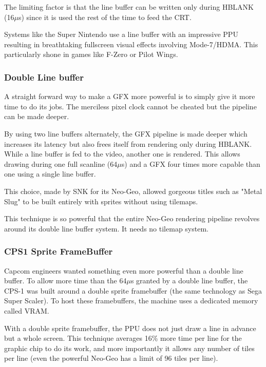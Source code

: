 The limiting factor is that the line buffer can be written only during HBLANK (16$\mu$s) since it is used the rest of the time to feed the CRT.

Systems like the Super Nintendo use a line buffer with an impressive PPU resulting in breathtaking fullscreen visual effects involving Mode-7/HDMA. This particularly shone in games like F-Zero or Pilot Wings.








\subsubsection{Double Line buffer}
A straight forward way to make a GFX more powerful is to simply give it more time to do its jobs. The merciless pixel clock cannot be cheated but the pipeline can be made deeper.

By using two line buffers alternately, the GFX pipeline is made deeper which increases its latency but also frees itself from rendering only during HBLANK. While a line buffer is fed to the video, another one is rendered. This allows drawing during one full scanline (64$\mu$s) and a GFX four times more capable than one using a single line buffer. 

This choice, made by SNK for its Neo-Geo, allowed gorgeous titles such as "Metal Slug" to be built entirely with sprites without using tilemaps. 

This technique is so powerful that the entire Neo-Geo rendering pipeline revolves around its double line buffer system. It needs no tilemap system.


\subsubsection{CPS1 Sprite FrameBuffer}
Capcom engineers wanted something even more powerful than a double line buffer. To allow more time than the 64$\mu$s granted by a double line buffer, the CPS-1 was built around a double sprite framebuffer (the same technology as  Sega Super Scaler). To host these framebuffers, the machine uses a dedicated memory called VRAM.

With a double sprite framebuffer, the PPU does not just draw a line in advance but a whole screen. This technique averages 16\% more time per line for the graphic chip to do its work, and more importantly it allows any number of tiles per line (even the powerful Neo-Geo has a limit of 96 tiles per line).

